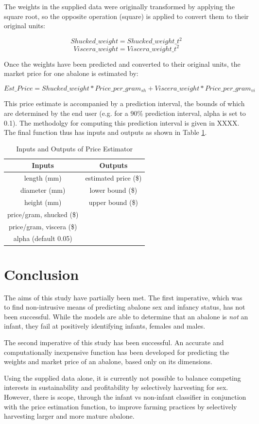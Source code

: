 \documentclass[11pt, a4paper]{article}
\begin{document}
    The weights in the supplied data were originally transformed by applying the square root, so the opposite operation (square) is applied to convert them to their original units:

    $$ Shucked\_weight = Shucked\_weight\_t ^ 2 $$
    $$ Viscera\_weight = Viscera\_weight\_t ^ 2 $$

    Once the weights have been predicted and converted to their original units, the market price for one abalone is estimated by:

    $$ Est\_Price = Shucked\_weight * Price\_per\_gram_{sh} + Viscera\_weight * Price\_per\_gram_{vi} $$

    This price estimate is accompanied by a prediction interval, the bounds of which are determined by the end user (e.g. for a 90\% prediction interval, alpha is set to 0.1). The methodolgy for computing this prediction interval is given in XXXX. The final function thus has inputs and outputs as shown in Table \ref{function}.

    \begin{table}[ht]
        \centering
        \begin{tabular}{|c|c|}
            \hline
            Inputs & Outputs \\
            \hline
            length (mm) & estimated price (\$) \\
            diameter (mm) & lower bound (\$) \\
            height (mm) & upper bound (\$) \\
            price/gram, shucked (\$) & \\
            price/gram, viscera (\$) & \\
            alpha (default 0.05) & \\
            \hline
        \end{tabular}
        \caption{Inputs and Outputs of Price Estimator}
        \label{function}
    \end{table}

    \section*{Conclusion}

    The aims of this study have partially been met. The first imperative, which was to find non-intrusive means of predicting abalone sex and infancy status, has not been successful. While the models are able to determine that an abalone is \textit{not} an infant, they fail at positively identifying infants, females and males.

    The second imperative of this study has been successful. An accurate and computationally inexpensive function has been developed for predicting the weights and market price of an abalone, based only on its dimensions.

    Using the supplied data alone, it is currently not possible to balance competing interests in sustainability and profitability by selectively harvesting for sex. However, there is scope, through the infant vs non-infant classifier in conjunction with the price estimation function, to improve farming practices by selectively harvesting larger and more mature abalone.
\end{document}
